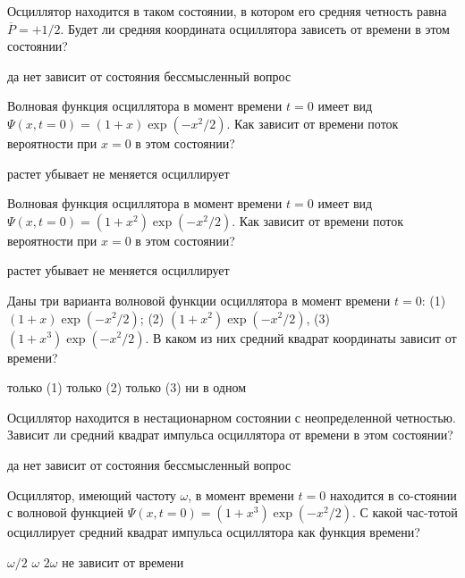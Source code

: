 \documentclass[11pt,a4paper]{exam}
\begin{document}
\begin{questions}
\question Осциллятор находится в таком состоянии, в котором его средняя четность равна $\overline{P}=+1/2$. Будет ли средняя координата осциллятора зависеть от времени в этом состоянии?
\begin{choices}
\choice да    
\choice нет      
\choice зависит от состояния    
\choice бессмысленный вопрос
\end{choices}

\question Волновая функция осциллятора в момент времени $t=0$ имеет вид $\Psi (x,t=0)=(1+x)\exp (-{{x}^{2}}/2)$. Как зависит от времени поток вероятности при $x=0$ в этом состоянии?
\begin{choices}
\choice растет   
\choice убывает  
\choice не меняется 
\choice осциллирует
\end{choices}

\question Волновая функция осциллятора в момент времени $t=0$ имеет вид $\Psi (x,t=0)=(1+{{x}^{2}})\exp (-{{x}^{2}}/2)$. Как зависит от времени поток вероятности при $x=0$ в этом состоянии?
\begin{choices}
\choice растет   
\choice убывает     
\choice не меняется 
\choice осциллирует
\end{choices}

\question Даны три варианта волновой функции осциллятора в момент времени $t=0$: (1) $(1+x)\exp (-{{x}^{2}}/2)$; (2) $(1+{{x}^{2}})\exp (-{{x}^{2}}/2)$, (3) $(1+{{x}^{3}})\exp (-{{x}^{2}}/2)$. В каком из них средний квадрат координаты зависит от времени?
\begin{choices}
\choice только (1)     
\choice только (2)     
\choice только (3)     
\choice ни в одном 
\end{choices}

\question Осциллятор находится в нестационарном состоянии с неопределенной четностью. Зависит ли средний квадрат импульса осциллятора от времени в этом состоянии?
\begin{choices}
\choice да    
\choice нет      
\choice зависит от состояния       
\choice бессмысленный вопрос
\end{choices}

\question Осциллятор, имеющий частоту $\omega $, в момент времени $t=0$ находится в со-стоянии с волновой функцией $\Psi (x,t=0)=(1+{{x}^{3}})\exp (-{{x}^{2}}/2)$. С какой час-тотой осциллирует средний квадрат импульса осциллятора как функция времени?
\begin{choices}
\choice $\omega /2$     
\choice $\omega $    
\choice $2\omega $      
\choice не зависит от времени 
\end{choices}


\end{questions}
\end{document}
